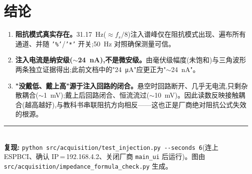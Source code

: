 \documentclass[11pt]{ctexart}
\begin{document}
\section{结论}
\begin{enumerate}
\item \textbf{阻抗模式真实存在。}\SI{31.17}{\hertz}($\approx f_s/8$)注入谱峰仅在阻抗模式出现、遍布所有通道、并随 \texttt{'\%'}/\texttt{'*'} 开关;\SI{50}{\hertz} 对照确保测量可信。
\item \textbf{注入电流是纳安级($\sim$\SI{24}{\nano\ampere}),不是微安级。}由毫伏级幅度(未饱和)与三角波形两条独立证据得出;此前文档中的"\SI{24}{\micro\ampere}"应更正为"$\sim$\SI{24}{\nano\ampere}"。
\item \textbf{"没戴低、戴上高"源于注入回路的闭合。}悬空时回路断开、几乎无电流,只剩杂散耦合($\sim$\SI{1}{\milli\volt});戴上后回路闭合、恒流流过($\sim$\SI{10}{\milli\volt})。因此读数反映接触耦合(越高越好),与教科书串联阻抗方向相反——这也正是厂商绝对阻抗公式失效的根源。
\end{enumerate}

\vspace{1em}
\noindent\rule{\linewidth}{0.4pt}\\[2pt]
{\small \textbf{复现:}\; \texttt{python src/acquisition/test\_injection.py -{}-seconds 6}\;(连上 ESPBCI、确认 IP\,=\,192.168.4.2、关闭厂商 \texttt{main\_ui} 后运行)。图由 \texttt{src/acquisition/impedance\_formula\_check.py} 生成。}
\end{document}
